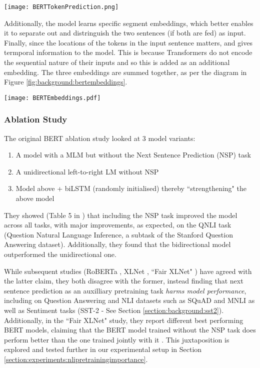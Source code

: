 {{\begin{center}
	\texttt{[image: BERTTokenPrediction.png]}
	\label{fig:background:berttokenprediction}
\end{center}

Additionally, the model learns specific segment embeddings, which better enables it to separate out and distringuish the two sentences (if both are fed) as input. Finally, since the locations of the tokens in the input sentence matters, and gives termporal information to the model. This is because Transformers do not encode the sequential nature of their inputs \cite{Vaswani} and so this is added as an additional embedding. The three embeddings are summed together, as per the diagram in Figure \ref{fig:background:bertembeddings}.

\begin{center}
	\texttt{[image: BERTEmbeddings.pdf]}
	\label{fig:background:bertembeddings}
\end{center}

\subsubsection{Ablation Study}
The original BERT ablation study looked at 3 model variants:
\begin{enumerate}
	\itemsep0em 
	\item A model with a MLM but without the Next Sentence Prediction (NSP) task
	\item A unidirectional left-to-right LM without NSP
	\item Model above + biLSTM (randomly initialised) thereby ``strengthening" the above model
\end{enumerate}
They showed (Table 5 in \cite{Devlin2018}) that including the NSP task improved the model across all tasks, with major improvements, as expected, on the QNLI task (Question Natural Language Inference, a subtask of the Stanford Question Answering dataset). Additionally, they found that the bidirectional model outperformed the unidirectional one.

While subsequent studies (RoBERTa \cite{Liu2019}, XLNet \cite{Yang2019}, ``Fair XLNet" \cite{XLNetTeam2019}) have agreed with the latter claim, they both disagree with the former, instead finding that next sentence prediction as an auxilliary pretraining task \textit{harms model performance}, including on Question Answering and NLI datasets such as SQuAD and MNLI as well as Sentiment tasks (SST-2 - See Section \ref{section:background:sst2}). Additionally, in the ``Fair XLNet" study, they report different best performing BERT models, claiming that the BERT model trained without the NSP task does perform better than the one trained jointly with it \cite{XLNetTeam2019}. This juxtaposition is explored and tested further in our experimental setup in Section \ref{section:experiments:nlipretrainingimportance}.

}}

